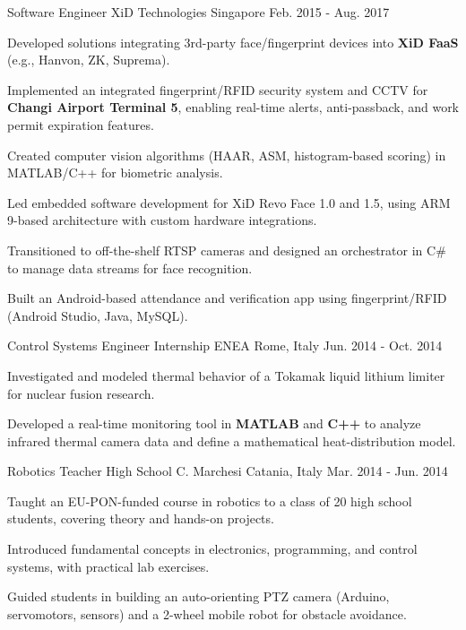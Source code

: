 \begin{cventries}
    \cventry
    {Software Engineer} %
    {XiD Technologies} %
    {Singapore} %
    {Feb. 2015 - Aug. 2017} %
    {
      \begin{cvitems}
        \item {Developed solutions integrating 3rd-party face/fingerprint devices into \textbf{XiD FaaS} (e.g., Hanvon, ZK, Suprema).}
        \item {Implemented an integrated fingerprint/RFID security system and CCTV for \textbf{Changi Airport Terminal 5}, enabling real-time alerts, anti-passback, and work permit expiration features.}
        \item {Created computer vision algorithms (HAAR, ASM, histogram-based scoring) in MATLAB/C++ for biometric analysis.}
        \item {Led embedded software development for XiD Revo Face 1.0 and 1.5, using ARM 9-based architecture with custom hardware integrations.}
        \item {Transitioned to off-the-shelf RTSP cameras and designed an orchestrator in C\# to manage data streams for face recognition.}
        \item {Built an Android-based attendance and verification app using fingerprint/RFID (Android Studio, Java, MySQL).}
      \end{cvitems}
    }

    \cventry
    {Control Systems Engineer Internship} %
    {ENEA} %
    {Rome, Italy} %
    {Jun. 2014 - Oct. 2014} %
    {
      \begin{cvitems}
        \item {Investigated and modeled thermal behavior of a Tokamak liquid lithium limiter for nuclear fusion research.}
        \item {Developed a real-time monitoring tool in \textbf{MATLAB} and \textbf{C++} to analyze infrared thermal camera data and define a mathematical heat-distribution model.}
      \end{cvitems}
    }

    \cventry
    {Robotics Teacher} %
    {High School C. Marchesi} %
    {Catania, Italy} %
    {Mar. 2014 - Jun. 2014} %
    {
      \begin{cvitems}
        \item {Taught an EU-PON-funded course in robotics to a class of 20 high school students, covering theory and hands-on projects.}
        \item {Introduced fundamental concepts in electronics, programming, and control systems, with practical lab exercises.}
        \item {Guided students in building an auto-orienting PTZ camera (Arduino, servomotors, sensors) and a 2-wheel mobile robot for obstacle avoidance.}
      \end{cvitems}
    }

\end{cventries}
